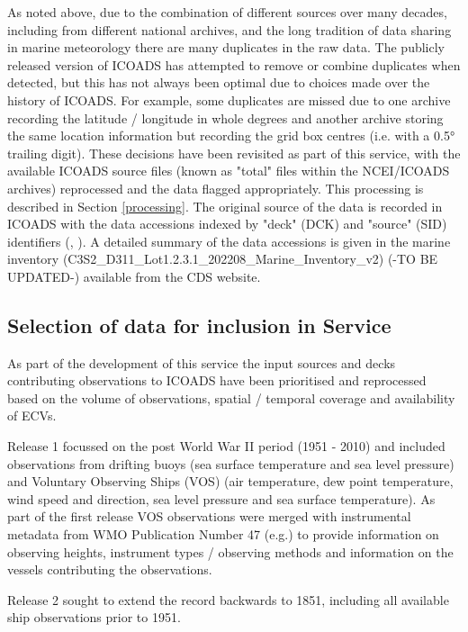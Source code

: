 As noted above, due to the combination of different sources over many decades, including from different national archives, and the long tradition of data sharing in marine meteorology there are many duplicates in the raw data. 
The publicly released version of ICOADS has attempted to remove or combine duplicates when detected, but this has not always been optimal due to choices made over the history of ICOADS. 
For example, some duplicates are missed due to one archive recording the latitude / longitude in whole degrees and another archive storing the same location information but recording the grid box centres (i.e. with a 0.5° trailing digit). 
These decisions have been revisited as part of this service, with the available ICOADS source files (known as "total" files within the NCEI/ICOADS archives) reprocessed and the data flagged appropriately.
This processing is described in Section \ref{processing}.
The original source of the data is recorded in ICOADS with the data accessions indexed by "deck" (DCK) and "source" (SID) identifiers (\cite{Woodruff1987}, \cite{Freeman2017}). 
A detailed summary of the data accessions is given in the marine inventory (C3S2\_D311\_Lot1.2.3.1\_202208\_Marine\_Inventory\_v2) (-TO BE UPDATED-) available from the CDS website.

\subsection{Selection of data for inclusion in Service}
As part of the development of this service the input sources and decks contributing observations to ICOADS have been prioritised and reprocessed based on the volume of observations, spatial / temporal coverage and availability of ECVs.

Release 1 focussed on the post World War II period (1951 - 2010) and included observations from drifting buoys (sea surface temperature and sea level pressure) and Voluntary Observing Ships (VOS) (air temperature, dew point temperature, wind speed and direction, sea level pressure and sea surface temperature).
As part of the first release VOS observations were merged with instrumental metadata from WMO Publication Number 47 (e.g.\cite{Kent2007}) to provide information on observing heights, instrument types / observing methods and information on the vessels contributing the observations. 

Release 2 sought to extend the record backwards to 1851, including all available ship observations prior to 1951.

